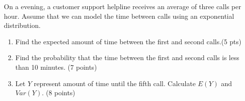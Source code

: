 
\item On a evening, a customer support helpline receives an average of three calls per hour. Assume that we can model the time between calls using an exponential distribution.

\begin{enumerate}

\item Find the expected amount of time between the first and second calls.(5 pts)

\vfill

\item Find the probability that the time between the first and second calls is less than 10 minutes. (7 points)

\vfill


\item Let $Y$ represent amount of time until the fifth call. Calculate $E(Y)$ and $Var(Y)$. (8 points)

\vfill

\end{enumerate}

